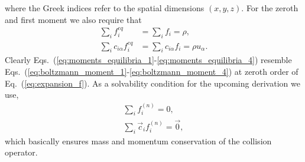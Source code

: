 where the Greek indices refer to the spatial dimensions $(x,y,z)$. 
For the zeroth and first moment we also require that
\begin{align}
    \sum_{i} f_{i}^{eq} &= \sum_{i} f_{i} = \rho, \\
    \sum_i c_{i\alpha}f_i^{eq} &= \sum_i c_{i\alpha}f_i = \rho u_{\alpha}.
\end{align}
Clearly Eqs.~(\ref{eq:moments_equilibria_1}-\ref{eq:moments_equilibria_4}) resemble Eqs.~(\ref{eq:boltzmann_moment_1}-\ref{eq:boltzmann_moment_4}) at zeroth order of Eq.~(\ref{eq:expansion_f}).
As a solvability condition for the upcoming derivation we use,
\begin{align}
    \sum_{i} f_{i}^{(n)} = 0, \label{eq:all_order_constraint_1}\\
    \sum_{i} \vec{c}_{i}f_{i}^{(n)} = \vec{0},  \label{eq:all_order_constraint_2}
\end{align}
which basically ensures mass and momentum conservation of the collision operator.

